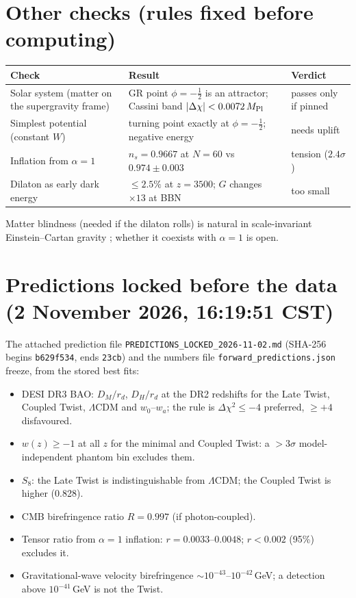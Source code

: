 \documentclass[11pt]{article}
\newcommand{\Mp}{M_{\rm Pl}}
\begin{document}
\section{Other checks (rules fixed before computing)}
\begin{center}\small
\begin{tabular}{p{}p{}p{}}
\toprule
Check & Result & Verdict\\
\midrule
Solar system (matter on the supergravity frame) & GR point $\phi=-\tfrac12$ is an attractor; Cassini band $|\Delta\chi|<0.0072\,\Mp$ & passes only if pinned\\
Simplest potential (constant $W$) & turning point exactly at $\phi=-\tfrac12$; negative energy & needs uplift\\
Inflation from $\alpha=1$ & $n_s=0.9667$ at $N=60$ vs $0.974\pm0.003$ & tension ($2.4\sigma$)\\
Dilaton as early dark energy & $\le2.5\%$ at $z=3500$; $G$ changes $\times13$ at BBN & too small\\
\bottomrule
\end{tabular}
\end{center}
Matter blindness (needed if the dilaton rolls) is natural in scale-invariant Einstein--Cartan gravity
\cite{karananas2021,piani2022}; whether it coexists with $\alpha=1$ is open.

\section{Predictions locked before the data (2 November 2026, 16:19:51 CST)}
The attached prediction file \texttt{PREDICTIONS\_LOCKED\_2026-11-02.md} (SHA-256 begins
\texttt{b629f534}, ends \texttt{23cb}) and the numbers file \texttt{forward\_predictions.json} freeze, from the stored
best fits:
\begin{itemize}
\item DESI DR3 BAO: $D_M/r_d$, $D_H/r_d$ at the DR2 redshifts for the Late Twist, Coupled Twist, $\Lambda$CDM and
$w_0$--$w_a$; the rule is $\Delta\chi^2\le-4$ preferred, $\ge+4$ disfavoured.
\item $w(z)\ge-1$ at all $z$ for the minimal and Coupled Twist: a $>3\sigma$ model-independent phantom bin excludes them.
\item $S_8$: the Late Twist is indistinguishable from $\Lambda$CDM; the Coupled Twist is higher (0.828).
\item CMB birefringence ratio $R=0.997$ (if photon-coupled).
\item Tensor ratio from $\alpha=1$ inflation: $r=0.0033$--$0.0048$; $r<0.002$ (95\%) excludes it.
\item Gravitational-wave velocity birefringence $\sim10^{-43}$--$10^{-42}$\,GeV; a detection above $10^{-41}$\,GeV is
not the Twist.
\end{itemize}
\end{document}

